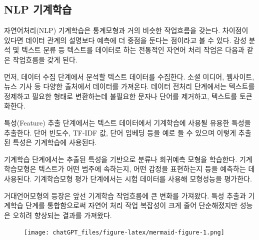 \documentclass[
  letterpaper,
]{book}
\begin{document}
\hypertarget{nlp-uxae30uxacc4uxd559uxc2b5}{%
\subsection{NLP 기계학습}\label{nlp-uxae30uxacc4uxd559uxc2b5}}

자연어처리(NLP) 기계학습은 통계모형과 거의 비슷한 작업흐름을 갖는다.
차이점이 있다면 데이터 관계의 설명보다 예측에 더 중점을 둔다는 점이라고
볼 수 있다. 감성 분석 및 텍스트 분류 등 텍스트를 데이터로 하는 전통적인
자연어 처리 작업은 다음과 같은 작업흐름을 갖게 된다.

먼저, 데이터 수집 단계에서 분석할 텍스트 데이터를 수집한다. 소셜 미디어,
웹사이트, 뉴스 기사 등 다양한 출처에서 데이터를 가져온다. 데이터 전처리
단계에서는 텍스트를 정제하고 필요한 형태로 변환하는데 불필요한 문자나
단어를 제거하고, 텍스트를 토큰화한다.

특성(Feature) 추출 단계에서는 텍스트 데이터에서 기계학습에 사용될 유용한
특성을 추출한다. 단어 빈도수, TF-IDF 값, 단어 임베딩 등을 예로 들 수
있으며 이렇게 추출된 특성은 기계학습에 사용된다.

기계학습 단계에서는 추출된 특성을 기반으로 분류나 회귀예측 모형을
학습한다. 기계학습모형은 텍스트가 어떤 범주에 속하는지, 어떤 감정을
표현하는지 등을 예측하는 데 사용된다. 기계학습모형 평가 단계에서는 시험
데이터를 사용해 모형성능을 평가한다.

거대언어모형의 등장은 앞선 기계학습 작업흐름에 큰 변화를 가져왔다. 특성
추출과 기계학습 단계를 통합함으로써 자연어 처리 작업 복잡성이 크게 줄어
단순해졌지만 성능은 오히려 향상되는 결과를 가져왔다.

\begin{figure}[H]

{\centering \texttt{[image: chatGPT\_files/figure-latex/mermaid-figure-1.png]}

}

\end{figure}
\end{document}
